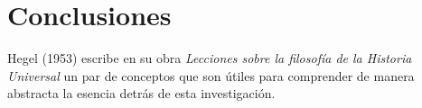 \chapter*{Conclusiones}


\noindent Hegel (1953) escribe en su obra \textit{Lecciones sobre la filosofía de la Historia Universal} un par de conceptos que son útiles para comprender de manera abstracta la esencia detrás de esta investigación.